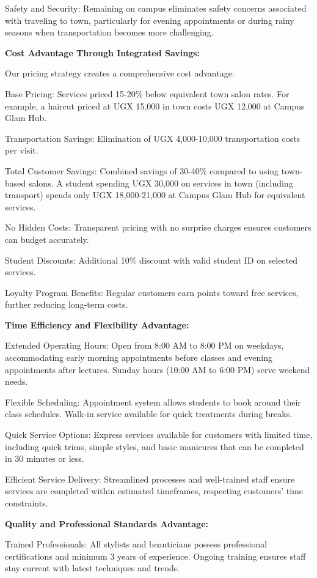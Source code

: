 \documentclass[a4paper,12pt]{article}
\begin{document}
Safety and Security: Remaining on campus eliminates safety concerns associated with traveling to town, particularly for evening appointments or during rainy seasons when transportation becomes more challenging.

\textbf{Cost Advantage Through Integrated Savings:}

Our pricing strategy creates a comprehensive cost advantage:

Base Pricing: Services priced 15-20\% below equivalent town salon rates. For example, a haircut priced at UGX 15,000 in town costs UGX 12,000 at Campus Glam Hub.

Transportation Savings: Elimination of UGX 4,000-10,000 transportation costs per visit.

Total Customer Savings: Combined savings of 30-40\% compared to using town-based salons. A student spending UGX 30,000 on services in town (including transport) spends only UGX 18,000-21,000 at Campus Glam Hub for equivalent services.

No Hidden Costs: Transparent pricing with no surprise charges ensures customers can budget accurately.

Student Discounts: Additional 10\% discount with valid student ID on selected services.

Loyalty Program Benefits: Regular customers earn points toward free services, further reducing long-term costs.

\textbf{Time Efficiency and Flexibility Advantage:}

Extended Operating Hours: Open from 8:00 AM to 8:00 PM on weekdays, accommodating early morning appointments before classes and evening appointments after lectures. Sunday hours (10:00 AM to 6:00 PM) serve weekend needs.

Flexible Scheduling: Appointment system allows students to book around their class schedules. Walk-in service available for quick treatments during breaks.

Quick Service Options: Express services available for customers with limited time, including quick trims, simple styles, and basic manicures that can be completed in 30 minutes or less.

Efficient Service Delivery: Streamlined processes and well-trained staff ensure services are completed within estimated timeframes, respecting customers' time constraints.

\textbf{Quality and Professional Standards Advantage:}

Trained Professionals: All stylists and beauticians possess professional certifications and minimum 3 years of experience. Ongoing training ensures staff stay current with latest techniques and trends.
\end{document}
